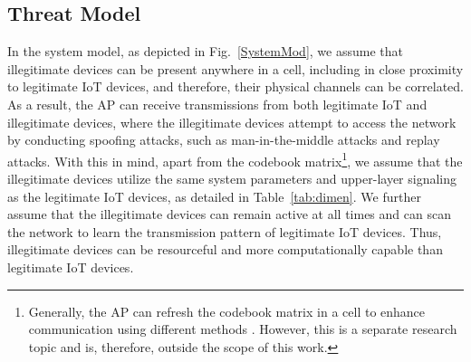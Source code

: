 \documentclass[journal,10pt]{IEEEtran}
\begin{document}
\subsection{Threat Model}
In the system model, as depicted in Fig.~\ref{SystemMod}, we assume that illegitimate devices can be present anywhere in a cell, including in close proximity to legitimate IoT devices, and therefore, their physical channels can be correlated. As a result, the AP can receive transmissions from both legitimate IoT and illegitimate devices, where the illegitimate devices attempt to access the network by conducting spoofing attacks, such as man-in-the-middle attacks and replay attacks. With this in mind, apart from the codebook matrix\footnote{Generally, the AP can refresh the codebook matrix in a cell to enhance communication using different methods \cite{koyluoglu2011interference, perazzone2018cryptographic}. However, this is a separate research topic and is, therefore, outside the scope of this work.}, we assume that the illegitimate devices utilize the same system parameters and upper-layer signaling as the legitimate IoT devices, as detailed in Table~\ref{tab:dimen}. We further assume that the illegitimate devices can remain active at all times and can scan the network to learn the transmission pattern of legitimate IoT devices. Thus, illegitimate devices can be resourceful and more computationally capable than legitimate IoT devices.       
\end{document}
